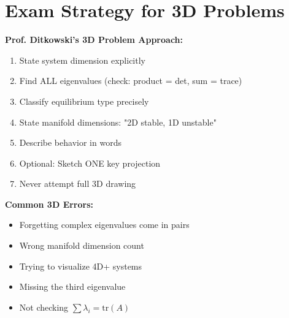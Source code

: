 \documentclass[12pt]{article}
\begin{document}
\section{Exam Strategy for 3D Problems}

\begin{examtip}
\textbf{Prof. Ditkowski's 3D Problem Approach:}
\begin{enumerate}
    \item State system dimension explicitly
    \item Find ALL eigenvalues (check: product = det, sum = trace)
    \item Classify equilibrium type precisely
    \item State manifold dimensions: "2D stable, 1D unstable"
    \item Describe behavior in words
    \item Optional: Sketch ONE key projection
    \item Never attempt full 3D drawing
\end{enumerate}
\end{examtip}

\begin{warning}
\textbf{Common 3D Errors:}
\begin{itemize}
    \item Forgetting complex eigenvalues come in pairs
    \item Wrong manifold dimension count
    \item Trying to visualize 4D+ systems
    \item Missing the third eigenvalue
    \item Not checking $\sum \lambda_{i} = \text{tr}(A)$
\end{itemize}
\end{warning}
\end{document}
